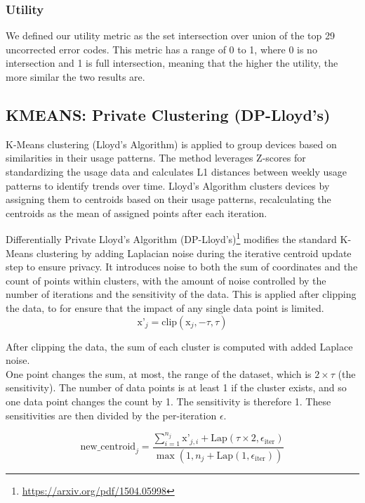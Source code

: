 \documentclass[12pt,letterpaper]{article}
\begin{document}
\subsubsection{Utility}

We defined our utility metric as the set intersection over union of the top 29 uncorrected error codes.
This metric has a range of 0 to 1, where 0 is no intersection and 1 is full intersection,
meaning that the higher the utility, the more similar the two results are.

\subsection{KMEANS: Private Clustering (DP-Lloyd's)}
K-Means clustering (Lloyd's Algorithm) is applied to group devices based on similarities in their usage patterns. The method leverages Z-scores for standardizing the usage data and calculates L1 distances between weekly usage patterns to identify trends over time. Lloyd's Algorithm clusters devices by assigning them to centroids based on their usage patterns, recalculating the centroids as the mean of assigned points after each iteration. 

Differentially Private Lloyd's Algorithm (DP-Lloyd's)\footnote{\url{https://arxiv.org/pdf/1504.05998}} modifies the standard K-Means clustering by adding Laplacian noise during the iterative centroid update step to ensure privacy. It introduces noise to both the sum of coordinates and the count of points within clusters, with the amount of noise controlled by the number of iterations and the sensitivity of the data. This is applied after clipping the data, to for ensure that the impact of any single data point is limited. 
\[
\text{x'}_j = \text{clip}\left( \text{x}_j, -\tau, \tau \right)
\]

After clipping the data, the sum of each cluster is computed with added Laplace noise. \\
One point changes the sum, at most, the range of the dataset, which is \(2 \times \tau\) (the sensitivity). The number of data points is at least 1 if the cluster exists, and so one data point changes the count by 1. The sensitivity is therefore 1. These sensitivities are then divided by the per-iteration  $\epsilon$.

\[
\text{new\_centroid}_j=
\frac{
    \sum_{i=1}^{n_j} \text{x'}_{j,i} + \text{Lap}(\tau \times 2, \epsilon_{\text{iter}})
}{
    \max\left( 1, n_j + \text{Lap}(1, \epsilon_{\text{iter}}) \right)
}
\]
\end{document}
